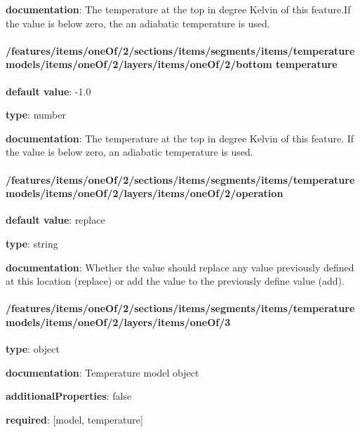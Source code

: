 \begin{itemized}
\item {\bf documentation}: The temperature at the top in degree Kelvin of this feature.If the value is below zero, the an adiabatic temperature is used.
\end{itemized}\paragraph{/features/items/oneOf/2/sections/items/segments/items/temperature models/items/oneOf/2/layers/items/oneOf/2/bottom temperature} \begin{itemized}
\item {\bf default value}: -1.0
\item {\bf type}: number
\item {\bf documentation}: The temperature at the top in degree Kelvin of this feature. If the value is below zero, an adiabatic temperature is used.
\end{itemized}\paragraph{/features/items/oneOf/2/sections/items/segments/items/temperature models/items/oneOf/2/layers/items/oneOf/2/operation} \begin{itemized}
\item {\bf default value}: replace
\item {\bf type}: string
\item {\bf documentation}: Whether the value should replace any value previously defined at this location (replace) or add the value to the previously define value (add).
\end{itemized}\paragraph{/features/items/oneOf/2/sections/items/segments/items/temperature models/items/oneOf/2/layers/items/oneOf/3} \begin{itemized}
\item {\bf type}: object
\item {\bf documentation}: Temperature model object
\item {\bf additionalProperties}: false
\item {\bf required}: [model, temperature]\end{itemized}
